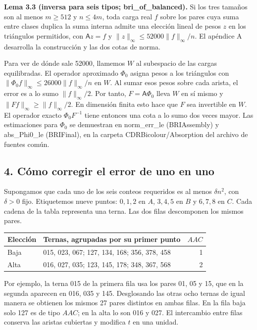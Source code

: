 \documentclass[spanish,11pt,a4paper]{article}
\begin{document}
\textbf{Lema 3.3 (inversa para seis tipos; bri\_of\_balanced).} Si los tres tamaños son al menos \(m\ge512\) y \(n\le4m\), toda carga real \(f\) sobre los pares cuya suma entre clases duplica la suma interna admite una elección lineal de pesos \(z\) en los triángulos permitidos, con \(\mathsf A z=f\) y \(\|z\|_\infty\le52000\|f\|_\infty/n\). El apéndice A desarrolla la construcción y las dos cotas de norma.

Para ver de dónde sale 52000, llamemos \(W\) al subespacio de las cargas equilibradas. El operador aproximado \(\Phi_0\) asigna pesos a los triángulos con \(\|\Phi_0 f\|_\infty\le26000\|f\|_\infty/n\) en \(W\). Al sumar esos pesos sobre cada arista, el error es a lo sumo \(\|f\|_\infty/2\). Por tanto, \(F=\mathsf A\Phi_0\) lleva \(W\) en sí mismo y \(\|Ff\|_\infty\ge\|f\|_\infty/2\). En dimensión finita esto hace que \(F\) sea invertible en \(W\). El operador exacto \(\Phi_0 F^{-1}\) tiene entonces una cota a lo sumo dos veces mayor. Las estimaciones para \(\Phi_0\) se demuestran en norm\_err\_le (BRIAssembly) y abs\_Phi0\_le (BRIFinal), en la carpeta CDRBicolour/Absorption del archivo de fuentes común.

\subsection{4. Cómo corregir el error de uno en uno}\label{cuxf3mo-corregir-el-error-de-uno-en-uno}

Supongamos que cada uno de los seis conteos requeridos es al menos \(\delta n^2\), con \(\delta>0\) fijo. Etiquetemos nueve puntos: \(0,1,2\) en \(A\), \(3,4,5\) en \(B\) y \(6,7,8\) en \(C\). Cada cadena de la tabla representa una terna. Las dos filas descomponen los mismos pares.

{\begin{longtable}[]{@{}llr@{}}
\toprule\noalign{}
Elección & Ternas, agrupadas por su primer punto & \(AAC\) \\
\midrule\noalign{}
\endhead
\bottomrule\noalign{}
\endlastfoot
Baja & 015, 023, 067; 127, 134, 168; 356, 378, 458 & 1 \\
Alta & 016, 027, 035; 123, 145, 178; 348, 367, 568 & 2 \\
\end{longtable}
}

Por ejemplo, la terna 015 de la primera fila usa los pares 01, 05 y 15, que en la segunda aparecen en 016, 035 y 145. Desglosando las otras ocho ternas de igual manera se obtienen los mismos 27 pares distintos en ambas filas. En la fila baja solo 127 es de tipo \(AAC\); en la alta lo son 016 y 027. El intercambio entre filas conserva las aristas cubiertas y modifica \(t\) en una unidad.
\end{document}
